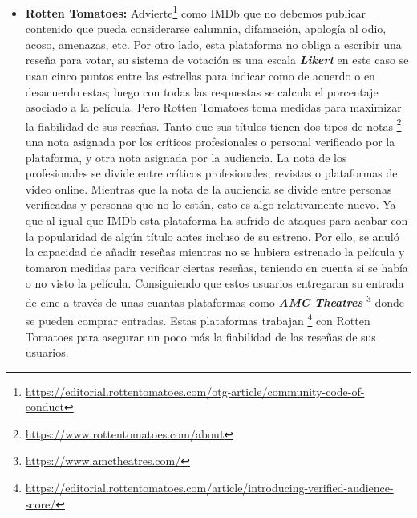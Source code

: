 \begin{itemize}
\item \textbf{Rotten Tomatoes:} Advierte\footnote{\url{https://editorial.rottentomatoes.com/otg-article/community-code-of-conduct}} como IMDb que no debemos publicar contenido que pueda considerarse calumnia, difamación, apología al odio, acoso, amenazas, etc. Por otro lado, esta plataforma no obliga a escribir una reseña para votar, su sistema de votación es una escala \textbf{\textit{Likert}} \cite{Elikert} en este caso se usan cinco puntos entre las estrellas para indicar como de acuerdo o en desacuerdo estas; luego con todas las respuestas se calcula el porcentaje asociado a la película. Pero Rotten Tomatoes toma medidas para maximizar la fiabilidad de sus reseñas. Tanto que sus títulos tienen dos tipos de notas \footnote{\url{https://www.rottentomatoes.com/about}} una nota asignada por los críticos profesionales o personal verificado por la plataforma, y otra nota asignada por la audiencia. La nota de los profesionales se divide entre críticos profesionales, revistas o plataformas de video online. Mientras que la nota de la audiencia se divide entre personas verificadas y personas que no lo están, esto es algo relativamente nuevo. Ya que al igual que IMDb esta plataforma ha sufrido de ataques para acabar con la popularidad de algún título antes incluso de su estreno. Por ello, se anuló la capacidad de añadir reseñas mientras no se hubiera estrenado la película y tomaron medidas para verificar ciertas reseñas, teniendo en cuenta si se había o no visto la película. Consiguiendo que estos usuarios entregaran su entrada de cine a través de unas cuantas plataformas como  \textbf{\textit{AMC Theatres}} \footnote{\url{https://www.amctheatres.com/}} donde se pueden comprar entradas. Estas plataformas trabajan \footnote{\url{https://editorial.rottentomatoes.com/article/introducing-verified-audience-score/}} con Rotten Tomatoes para asegurar un poco más la fiabilidad de las reseñas de sus usuarios.

\end{itemize}
